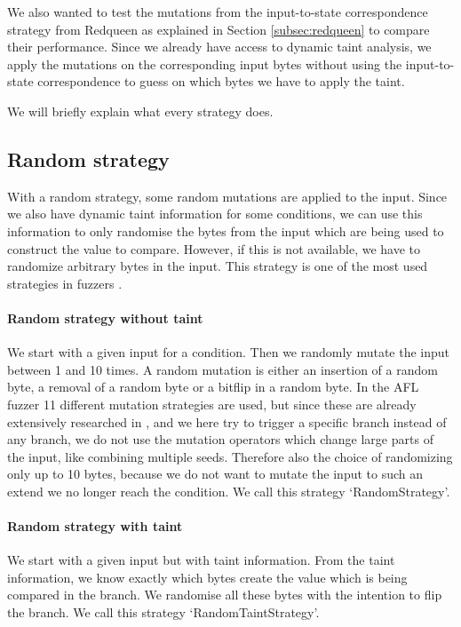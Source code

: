 We also wanted to test the mutations from the input-to-state correspondence strategy from Redqueen as explained in Section \ref{subsec:redqueen} to compare their performance. Since we already have access to dynamic taint analysis, we apply the mutations on the corresponding input bytes without using the input-to-state correspondence to guess on which bytes we have to apply the taint. %

We will briefly explain what every strategy does.

\subsection{Random strategy}
With a random strategy, some random mutations are applied to the input. Since we also have dynamic taint information for some conditions, we can use this information to only randomise the bytes from the input which are being used to construct the value to compare. However, if this is not available, we have to randomize arbitrary bytes in the input. This strategy is one of the most used strategies in fuzzers \cite{aflfuzzer, fioraldi2020afl++, rawat2017vuzzer, chen2018angora}.
\paragraph{Random strategy without taint}
We start with a given input for a condition. Then we randomly mutate the input between 1 and 10 times. A random mutation is either an insertion of a random byte, a removal of a random byte or a bitflip in a random byte.
In the AFL fuzzer\cite{aflfuzzer} 11 different mutation strategies are used, but since these are already extensively researched in \cite{lyu2019mopt}, and we here try to trigger a specific branch instead of any branch, we do not use the mutation operators which change large parts of the input, like combining multiple seeds. Therefore also the choice of randomizing only up to 10 bytes, because we do not want to mutate the input to such an extend we no longer reach the condition.
We call this strategy `RandomStrategy'.
\paragraph{Random strategy with taint}
We start with a given input but with taint information. From the taint information, we know exactly which bytes create the value which is being compared in the branch. We randomise all these bytes with the intention to flip the branch.
We call this strategy `RandomTaintStrategy'.

